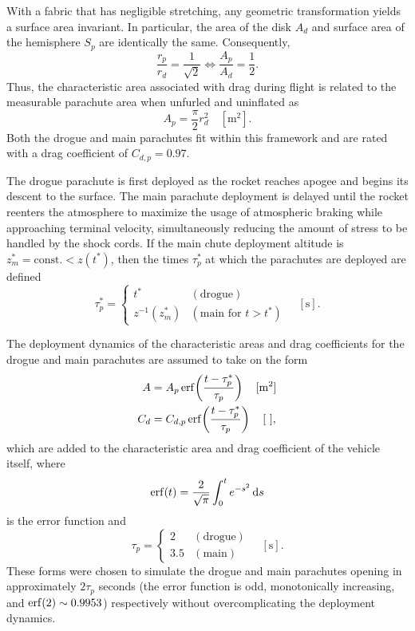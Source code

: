 \documentclass[11pt]{thesis}
\numberwithin{equation}{section}
\begin{document}
With a fabric that has negligible stretching, any geometric transformation yields a surface area invariant. In particular, the area of the disk $A_d$ and surface area of the hemisphere $S_p$ are identically the same. Consequently,
\begin{equation}
\frac{r_p}{r_d} = \frac{1}{\sqrt{2}} \iff \frac{A_p}{A_d} = \frac{1}{2}.
\end{equation}
Thus, the characteristic area associated with drag during flight is related to the measurable parachute area when unfurled and uninflated as
\begin{equation}
A_p = \frac{\pi}{2} r_d^2 \quad [\si{\m\squared}].
\end{equation}
Both the drogue and main parachutes fit within this framework and are rated with a drag coefficient of $C_{d,p} = 0.97$. 

The drogue parachute is first deployed as the rocket reaches apogee and begins its descent to the surface. The main parachute deployment is delayed until the rocket reenters the atmosphere to maximize the usage of atmospheric braking while approaching terminal velocity, simultaneously reducing the amount of stress to be handled by the shock cords. If the main chute deployment altitude is $z_m^* = \mathrm{const.} < z(t^*)$, then the times $\tau_p^*$ at which the parachutes are deployed are defined
\begin{equation}
\tau_{p}^* =
\begin{cases}
t^* & (\text{drogue}) \\
z^{-1}(z_m^*) & (\text{main for }t > t^*)
\end{cases}
\quad [\si{\s}].
\end{equation}

The deployment dynamics of the characteristic areas and drag coefficients for the drogue and main parachutes are assumed to take on the form
\begin{align}
A &= A_p \erf\!\left(\frac{t - \tau_p^*}{\tau_p}\right) \quad [\si{\m\squared}] \\
C_d &= C_{d,p} \erf\!\left(\frac{t - \tau_p^*}{\tau_p}\right) \quad [\ ],
\end{align}
which are added to the characteristic area and drag coefficient of the vehicle itself, where
\begin{equation}
\erf(t) = \frac{2}{\sqrt{\pi}} \int_0^t e^{-s^2} \dd{s}
\end{equation}
is the error function and
\begin{equation} 
\tau_p = 
\begin{cases}
2 & (\text{drogue}) \\
3.5 & (\text{main})
\end{cases}
\quad [\si{\s}].
\end{equation}
These forms were chosen to simulate the drogue and main parachutes opening in approximately $2\tau_p$ seconds (the error function is odd, monotonically increasing, and $\erf(2) \sim 0.9953$) respectively without overcomplicating the deployment dynamics.
\end{document}
